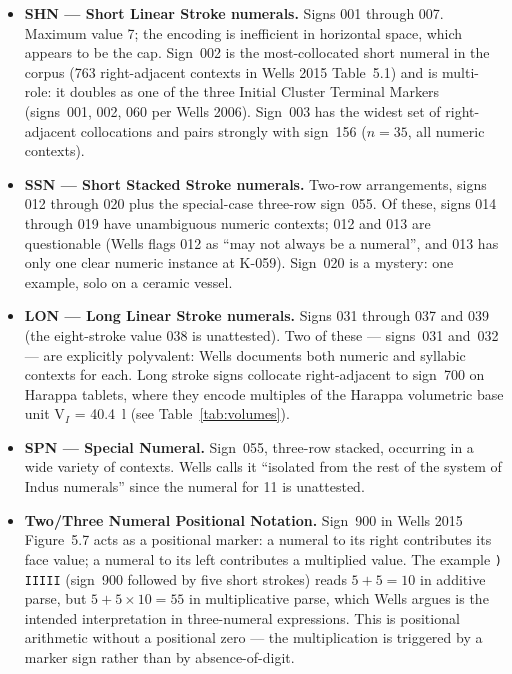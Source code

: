 \begin{itemize}
\item \textbf{SHN --- Short Linear Stroke numerals.} Signs 001
  through 007. Maximum value 7; the encoding is inefficient in
  horizontal space, which appears to be the cap. Sign~002 is the
  most-collocated short numeral in the corpus (763 right-adjacent
  contexts in Wells 2015 Table~5.1) and is multi-role: it doubles as
  one of the three Initial Cluster Terminal Markers
  (signs~001, 002, 060 per Wells 2006). Sign~003 has the widest set
  of right-adjacent collocations and pairs strongly with sign~156
  ($n=35$, all numeric contexts).
\item \textbf{SSN --- Short Stacked Stroke numerals.} Two-row
  arrangements, signs 012 through 020 plus the special-case
  three-row sign~055. Of these, signs 014 through 019 have
  unambiguous numeric contexts; 012 and 013 are questionable
  (Wells flags 012 as ``may not always be a numeral'', and 013 has
  only one clear numeric instance at K-059). Sign~020 is a mystery:
  one example, solo on a ceramic vessel.
\item \textbf{LON --- Long Linear Stroke numerals.} Signs 031 through
  037 and 039 (the eight-stroke value 038 is unattested). Two of
  these --- signs~031 and~032 --- are explicitly polyvalent: Wells
  documents both numeric and syllabic contexts for each. Long stroke
  signs collocate right-adjacent to sign~700 on Harappa tablets,
  where they encode multiples of the Harappa volumetric base unit
  V$_I$ = \SI{40.4}{\litre} (see Table~\ref{tab:volumes}).
\item \textbf{SPN --- Special Numeral.} Sign~055, three-row stacked,
  occurring in a wide variety of contexts. Wells calls it ``isolated
  from the rest of the system of Indus numerals'' since the numeral
  for 11 is unattested.
\item \textbf{Two/Three Numeral Positional Notation.} Sign~900 in
  Wells 2015 Figure~5.7 acts as a positional marker: a numeral to
  its right contributes its face value; a numeral to its left
  contributes a multiplied value. The example
  \texttt{) IIIII} (sign~900 followed by five short strokes)
  reads $5 + 5 = 10$ in additive parse, but $5 + 5 \times 10 = 55$
  in multiplicative parse, which Wells argues is the intended
  interpretation in three-numeral expressions. This is positional
  arithmetic without a positional zero --- the multiplication is
  triggered by a marker sign rather than by absence-of-digit.
\end{itemize}

